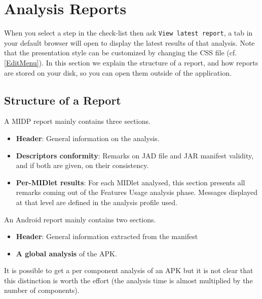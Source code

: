 \section{Analysis Reports}

When you select a step in the check-list then ask \texttt{View latest
report}, a tab in your default browser will open to display the latest results
of that analysis. Note that the presentation style can be customized by changing the CSS file
(cf. \ref{EditMenu}). In this section we explain the structure of a
report, and how reports are stored on your disk, so you can open them
outside of the \ma application.

\subsection{Structure of a Report}

A MIDP report mainly contains three sections.

\begin{itemize}
\item\textbf{Header}: General information on the analysis.
\item\textbf{Descriptors conformity}: Remarks on JAD file and JAR manifest
  validity, and if both are given, on their consistency. 
\item\textbf{Per-MIDlet results}: For each MIDlet analysed, this section
  presents all remarks coming out of the Features Usage analysis
  phase. Messages displayed at that level are
  defined in the analysis profile used. 
\end{itemize}

An Android report mainly contains two sections.
\begin{itemize}
  \item \textbf{Header}: General information extracted from the manifest
  \item \textbf{A global analysis} of the APK. 
\end{itemize}
It is possible to get a per component analysis of an APK but it is not clear
that this distinction is worth the effort (the analysis time is almost
multiplied by the number of components).

